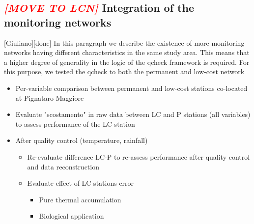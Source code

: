 \documentclass[authoryear,preprint,review,12pt]{elsarticle}
\newcommand{\note}[1]{\emph{\textcolor{red}{#1}}}
\begin{document}
\subsection{\note{[MOVE TO LCN]} Integration of the monitoring networks\label{Integration}}[Giuliano][done]
In this paragraph we describe the existence of more monitoring networks having different characteristics in the same study area.
This means that a higher degree of generality in the logic of the qcheck framework is required.
For this purpose, we tested the qcheck to both the permanent and low-cost network
\begin{itemize}
    \item Per-variable comparison between permanent and low-cost stations co-located at Pignataro Maggiore
    \item Evaluate "scostamento" in raw data between LC and P stations (all variables) to assess performance of the LC station
    \item After quality control (temperature, rainfall)
    \begin{itemize}
        \item Re-evaluate difference LC-P to re-assess performance after quality control and data reconstruction 
        \item Evaluate effect of LC stations error
        \begin{itemize}
            \item Pure thermal accumulation
            \item Biological application
        \end{itemize}
    \end{itemize}
\end{itemize}
\end{document}
